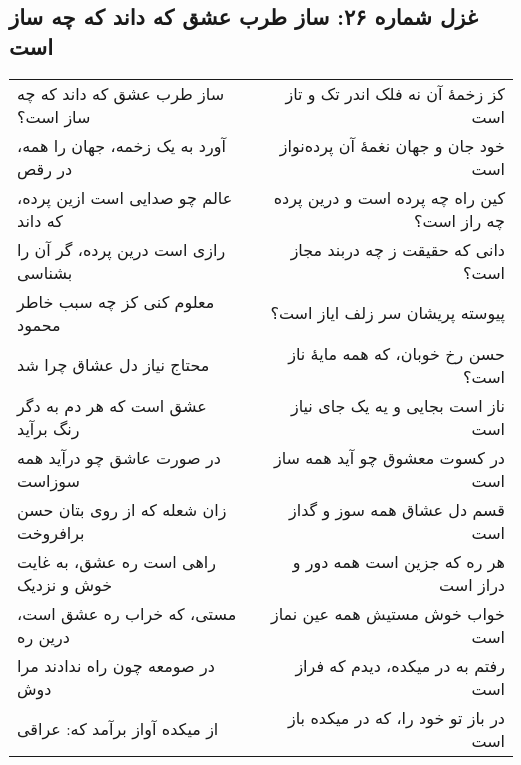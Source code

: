 \begin{center}
\section*{غزل شماره ۲۶: ساز طرب عشق که داند که چه ساز است}
\label{sec:026}
\begin{longtable}{l p{0.5cm} r}
ساز طرب عشق که داند که چه ساز است؟
&&
کز زخمهٔ آن نه فلک اندر تک و تاز است
\\
آورد به یک زخمه، جهان را همه، در رقص
&&
خود جان و جهان نغمهٔ آن پرده‌نواز است
\\
عالم چو صدایی است ازین پرده، که داند
&&
کین راه چه پرده است و درین پرده چه راز است؟
\\
رازی است درین پرده، گر آن را بشناسی
&&
دانی که حقیقت ز چه دربند مجاز است؟
\\
معلوم کنی کز چه سبب خاطر محمود
&&
پیوسته پریشان سر زلف ایاز است؟
\\
محتاج نیاز دل عشاق چرا شد
&&
حسن رخ خوبان، که همه مایهٔ ناز است؟
\\
عشق است که هر دم به دگر رنگ برآید
&&
ناز است بجایی و یه یک جای نیاز است
\\
در صورت عاشق چو درآید همه سوزاست
&&
در کسوت معشوق چو آید همه ساز است
\\
زان شعله که از روی بتان حسن برافروخت
&&
قسم دل عشاق همه سوز و گداز است
\\
راهی است ره عشق، به غایت خوش و نزدیک
&&
هر ره که جزین است همه دور و دراز است
\\
مستی، که خراب ره عشق است، درین ره
&&
خواب خوش مستیش همه عین نماز است
\\
در صومعه چون راه ندادند مرا دوش
&&
رفتم به در میکده، دیدم که فراز است
\\
از میکده آواز برآمد که: عراقی
&&
در باز تو خود را، که در میکده باز است
\\
\end{longtable}
\end{center}

